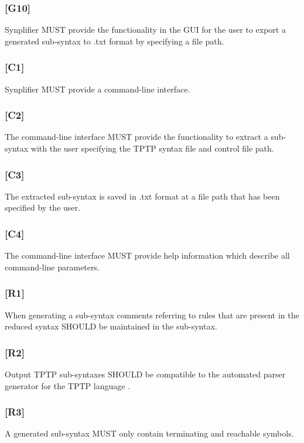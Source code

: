 \subsubsection{[G10]}\label{G10}
\ac{Synplifier} MUST provide the functionality in the GUI for the user to export a generated sub-syntax to .txt format by specifying a file path.
\subsubsection{[C1]}\label{C1}
\ac{Synplifier} MUST provide a command-line interface.
\subsubsection{[C2]}\label{C2}
The command-line interface MUST provide the functionality to extract a sub-syntax with the user specifying the \ac{TPTP} syntax file and control file path.
\subsubsection{[C3]}\label{C3}
The extracted sub-syntax is saved in .txt format at a file path that has been specified by the user.
\subsubsection{[C4]}\label{C4}
The command-line interface MUST provide help information which describe all command-line parameters.
\subsubsection{[R1]}\label{R1}
When generating a sub-syntax comments referring to rules that are present in the reduced syntax SHOULD be maintained in the sub-syntax.
\subsubsection{[R2]}\label{R2}
Output \ac{TPTP} sub-syntaxes SHOULD be compatible to the automated parser generator for the \ac{TPTP} language \cite{VS06}.
\subsubsection{[R3]}\label{R3}
A generated sub-syntax MUST only contain terminating and reachable symbols.


%

